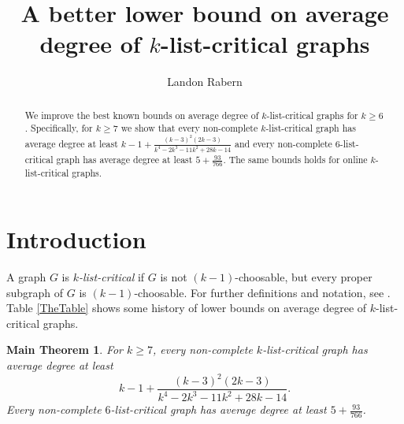 \documentclass[10pt]{article}
\title{A better lower bound on average degree of $k$-list-critical graphs}
\author{Landon Rabern}
\theoremstyle{plain}
\newtheorem*{MainTheorem}{Main Theorem}
\theoremstyle{definition}
\theoremstyle{remark}
\begin{document}
\maketitle

\begin{abstract}
		We improve the best known bounds on average degree of $k$-list-critical graphs for $k \ge 6$. 
		Specifically, for $k \ge 7$ we show that every non-complete $k$-list-critical graph has average degree at least $k-1 + \frac{(k-3)^2 (2 k-3)}{k^4-2 k^3-11 k^2+28 k-14}$
		and every non-complete $6$-list-critical graph has average degree at least $5 + \frac{93}{766}$.
		The same bounds holds for online $k$-list-critical graphs.
\end{abstract}

\section{Introduction}
A graph $G$ is \emph{$k$-list-critical} if $G$ is not $(k-1)$-choosable, but every
proper subgraph of $G$ is $(k-1)$-choosable.  For further definitions and notation, see \cite{OreVizing, DischargingLowerBound}. 
Table \ref{TheTable} shows some history of lower bounds on average degree of $k$-list-critical graphs.

\begin{MainTheorem}
For $k \ge 7$, every non-complete $k$-list-critical graph has average degree at least \[k-1 + \frac{(k-3)^2 (2 k-3)}{k^4-2 k^3-11 k^2+28 k-14}.\]
Every non-complete $6$-list-critical graph has average degree at least $5 + \frac{93}{766}$.
\end{MainTheorem}
\end{document}
